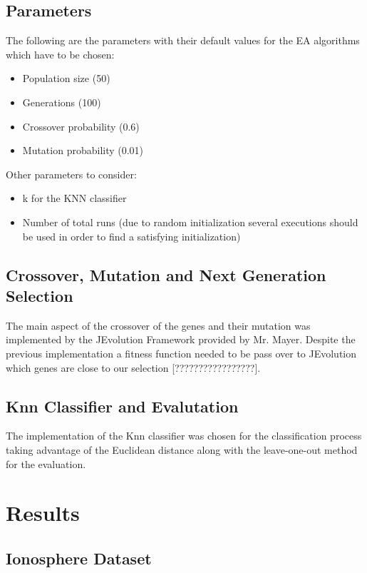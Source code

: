 \documentclass[11pt,onecolumn,a4paper]{article}
\begin{document}
\subsection{Parameters}

The following are the parameters with their default values for the EA algorithms which have to be chosen:

\begin{itemize}
\item {Population size (50)}
\item {Generations (100)}
\item {Crossover probability (0.6)}
\item{Mutation probability (0.01)}
\end{itemize}

Other parameters to consider:

\begin{itemize}

\item {k for the KNN classifier}
\item {Number of total runs (due to random initialization several executions should be used in order to find a satisfying initialization)}
\end{itemize}



\subsection{Crossover, Mutation and Next Generation Selection}
\label{sec:eval}
The main aspect of the crossover of the genes and their mutation was implemented by the JEvolution Framework provided by Mr. Mayer. Despite the previous implementation a fitness function needed to be pass over to JEvolution which genes are close to our selection [?????????????????].

\subsection{Knn Classifier and Evalutation }
The implementation of the Knn classifier was chosen for the classification process taking advantage of the Euclidean distance along with the leave-one-out method for the evaluation. 


\section{Results}

\subsection{Ionosphere Dataset}
\end{document}
